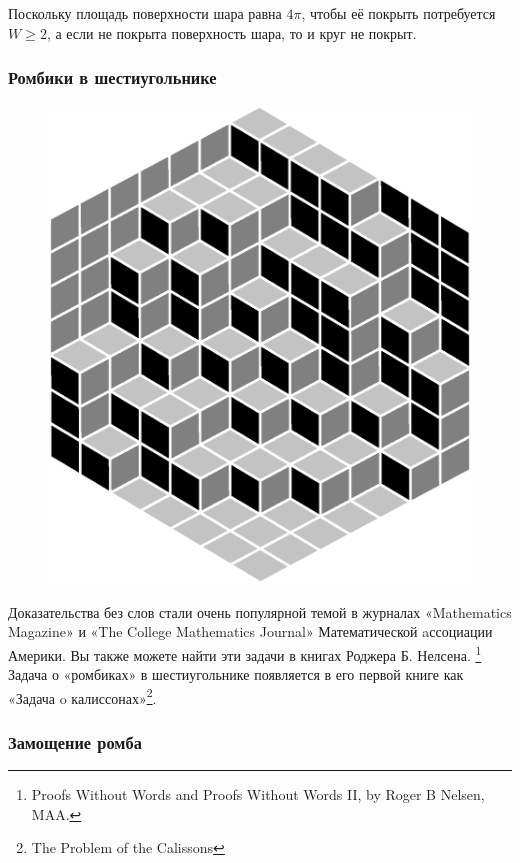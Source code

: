 Поскольку площадь поверхности шара равна $4\pi$, чтобы её покрыть потребуется $W\ge 2$,
а если не покрыта поверхность шара, то и круг не покрыт.

\subsubsection*{Ромбики в шестиугольнике}%

\begin{figure}[h!]
\centering
\includegraphics[scale=0.5]{Figs/Geometry/diamonds}
\end{figure}
\heart

Доказательства без слов стали очень популярной темой в журналах «Mathematics Magazine» и «The College Mathematics Journal» Математической aссоциации Америки.
Вы также можете найти эти задачи в книгах Роджера Б. Нелсена.%
\footnote{Proofs Without Words and Proofs Without Words II, by Roger B Nelsen, MAA.}
Задача о «ромбиках» в шестиугольнике появляется в его первой книге как «Задача o калиссонах»\footnote{The Problem of the Calissons}.

\subsubsection*{Замощение ромба}%

